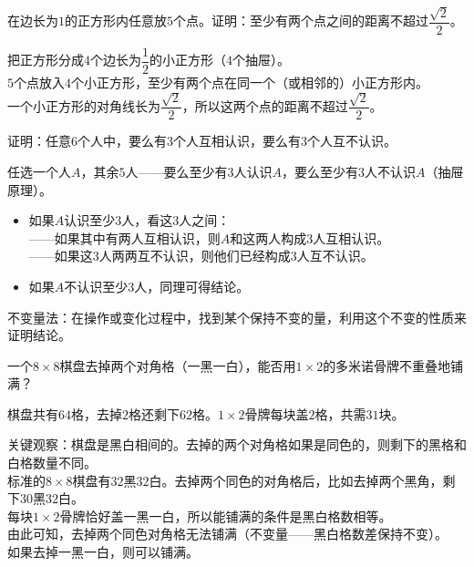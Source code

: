 \begin{example}
在边长为$1$的正方形内任意放$5$个点。证明：至少有两个点之间的距离不超过$\dfrac{\sqrt2}{2}$。
\end{example}
\begin{solution}
把正方形分成$4$个边长为$\dfrac12$的小正方形（$4$个抽屉）。\\
$5$个点放入$4$个小正方形，至少有两个点在同一个（或相邻的）小正方形内。\\
一个小正方形的对角线长为$\dfrac{\sqrt2}{2}$，所以这两个点的距离不超过$\dfrac{\sqrt2}{2}$。
\end{solution}

\begin{example}
证明：任意$6$个人中，要么有$3$个人互相认识，要么有$3$个人互不认识。
\end{example}
\begin{solution}
任选一个人$A$，其余$5$人——要么至少有$3$人认识$A$，要么至少有$3$人不认识$A$（抽屉原理）。
\begin{itemize}
\item 如果$A$认识至少$3$人，看这$3$人之间：\\
——如果其中有两人互相认识，则$A$和这两人构成$3$人互相认识。\\
——如果这$3$人两两互不认识，则他们已经构成$3$人互不认识。
\item 如果$A$不认识至少$3$人，同理可得结论。
\end{itemize}
\end{solution}


不变量法：在操作或变化过程中，找到某个保持不变的量，利用这个不变的性质来证明结论。

\begin{example}
一个$8\times8$棋盘去掉两个对角格（一黑一白），能否用$1\times2$的多米诺骨牌不重叠地铺满？
\end{example}
\begin{solution}
棋盘共有$64$格，去掉$2$格还剩下$62$格。$1\times2$骨牌每块盖$2$格，共需$31$块。

关键观察：棋盘是黑白相间的。去掉的两个对角格如果是同色的，则剩下的黑格和白格数量不同。\\
标准的$8\times8$棋盘有$32$黑$32$白。去掉两个同色的对角格后，比如去掉两个黑角，剩下$30$黑$32$白。\\
每块$1\times2$骨牌恰好盖一黑一白，所以能铺满的条件是黑白格数相等。\\
由此可知，去掉两个同色对角格无法铺满（不变量——黑白格数差保持不变）。\\
如果去掉一黑一白，则可以铺满。
\end{solution}

